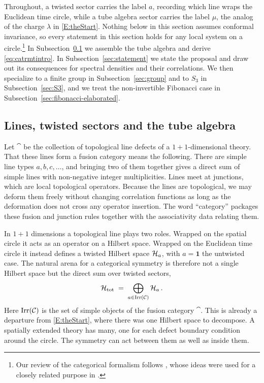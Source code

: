 \documentclass[11pt]{article}
\numberwithin{equation}{section}
\begin{document}
Throughout, a twisted sector carries the label $a$, recording which line wraps the Euclidean time
circle, while a tube algebra sector carries the label $\mu$, the analog of the charge $\lambda$ in
\eqref{E:theStart}. Nothing below in this section assumes conformal invariance, so every statement in this section holds for any local
system on a circle.\footnote{Our review of the categorical formalism follows
\cite{Lin:2022dhv,Bartsch:2023wvv}, whose ideas were used for a closely related purpose in
\cite{Ferragatta:2026ejs}.} In Subsection~\ref{sec:lines} we assemble the tube algebra and derive
\eqref{eq:catrmtintro}. In Subsection~\ref{sec:statement} we state the proposal and draw out its
consequences for spectral densities and their correlations. We then specialize to a finite group in
Subsection~\ref{sec:group} and to $S_3$ in Subsection~\ref{sec:S3}, and we treat the non-invertible
Fibonacci case in Subsection~\ref{sec:fibonacci-elaborated}.

\subsection{Lines, twisted sectors and the tube algebra}
\label{sec:lines}

Let $\cat$ be the collection of topological line defects of a $1+1$-dimensional theory. That these
lines form a fusion category means the following. There are simple line types $a, b, c, \dots$,
and bringing two of them together gives a direct sum of simple lines with non-negative integer
multiplicities. Lines meet at junctions, which are local topological operators. Because the lines
are topological, we may deform them freely without changing correlation functions as long as the
deformation does not cross any operator insertion. The word ``category'' packages these fusion and
junction rules together with the associativity data relating them.

In $1+1$ dimensions a topological line plays two roles. Wrapped on the spatial circle it acts as
an operator on a Hilbert space. Wrapped on the Euclidean time circle it instead defines a twisted
Hilbert space $\mathcal{H}_a$, with $a=\mathbf 1$ the untwisted case. The natural arena for a categorical
symmetry is therefore not a single Hilbert space but the direct sum over twisted sectors,
\begin{equation}
  \mathcal{H}_{\rm tot} \;=\; \bigoplus_{a \in \mathrm{Irr}(\mathcal{C})} \mathcal{H}_a \,.
  \label{eq:Htot}
\end{equation}
Here $\mathrm{Irr}(\mathcal{C})$ is the set of simple objects of the fusion category $
\cat$. 
This is already a departure from \eqref{E:theStart}, where there was one Hilbert space to
decompose. A spatially extended theory has many, one for each defect boundary condition around the
circle. The symmetry can act between them as well as inside them.
\end{document}
